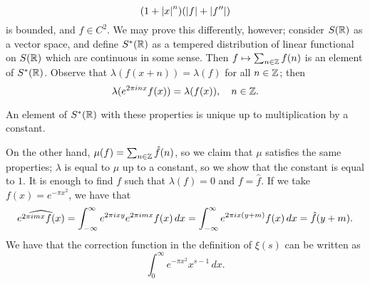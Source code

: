 \[ (1 + \left\lvert x \right\rvert^n)(\left\lvert f \right\rvert + \left\lvert f'' \right\rvert) \]
is bounded, and $f \in C^2$. We may prove this differently, however; consider $S(\mathbb R)$ as a vector space, and define $S^\ast(\mathbb R)$ as a tempered distribution of linear functional on $S(\mathbb R)$ which are continuous in some sense. Then $f \mapsto \sum_{n \in \mathbb Z} f(n)$ is an element of $S^\ast(\mathbb R)$. Observe that $\lambda(f(x + n)) = \lambda(f)$ for all $n \in \mathbb Z$; then
\[ \lambda(e^{2\pi i n x}f(x)) = \lambda(f(x)), \quad n \in \mathbb Z. \] \vspace{-22pt}
\begin{lemma}
    An element of $S^\ast(\mathbb R)$ with these properties is unique up to multiplication by a constant.
\end{lemma}
\noindent On the other hand, $\mu(f) = \sum_{n \in \mathbb Z} \hat{f}(n)$, so we claim that $\mu$ satisfies the same properties; $\lambda$ is equal to $\mu$ up to a constant, so we show that the constant is equal to $1$. It is enough to find $f$ such that $\lambda(f) = 0$ and $f = \hat f$. If we take $f(x) = e^{-\pi x^2}$, we have that
\[ \widehat{e^{2\pi i m x} f(x)} = \int_{-\infty}^\infty e^{2\pi i x y} e^{2\pi i m x} f(x) \, dx = \int_{-\infty}^\infty e^{2\pi i x(y + m)} f(x) \, dx = \hat{f}(y + m). \]
We have that the correction function in the definition of $\xi(s)$ can be written as
\[ \int_0^\infty e^{-\pi x^2} x^{s-1} \, dx. \]
